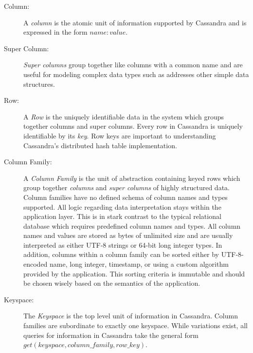 \documentclass[twocolumn]{article}
\begin{document}
\begin{description}
  \item[Column:] A \emph{column} is the atomic unit of information supported by Cassandra and is expressed in the form $name : value$.
  \item[Super Column:] \emph{Super columns} group together like columns with a common name and are useful for modeling complex data types such as addresses other simple data structures.
  \item[Row:] A \emph{Row} is the uniquely identifiable data in the system which groups together columns and super columns.  Every row in Cassandra is uniquely identifiable by its \emph{key}.  Row keys are important to understanding Cassandra's distributed hash table implementation.
  \item[Column Family:] A \emph{Column Family} is the unit of abstraction containing keyed rows which group together \emph{columns} and \emph{super columns} of highly structured data.  Column families have no defined schema of column names and types supported.  All logic regarding data interpretation stays within the application layer.  This is in stark contrast to the typical relational database which requires predefined column names and types.  All column names and values are stored as bytes of unlimited size and are usually interpreted as either UTF-8 strings or 64-bit long integer types.  In addition, columns within a column family can be sorted either by UTF-8-encoded name, long integer, timestamp, or using a custom algorithm provided by the application.  This sorting criteria is immutable and should be chosen wisely based on the semantics of the application.
  \item[Keyspace:] The \emph{Keyspace} is the top level unit of information in Cassandra.  Column families are subordinate to exactly one keyspace.  While variations exist, all queries for information in Cassandra take the general form $get(keyspace,column\_family,row\_key)$.
\end{description}
\end{document}

